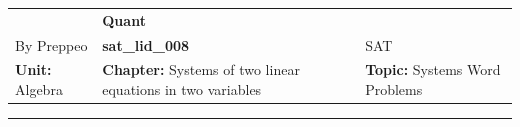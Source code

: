 \documentclass[11pt,paper=a4,answers]{exam}
\begin{document}
\begin{center}
    \centering
    \renewcommand{\arraystretch}{1.5}
    \begin{tabularx}{\textwidth}{YYY}
    & \normalsize\bf{{\Large{{Quant}}}} & \\
    By Preppeo & \normalsize\bf{{sat\_lid\_008}} & SAT\\
    \normalsize{{\textbf{{Unit:}} Algebra}} & \normalsize{{\textbf{{Chapter:}} Systems of two linear equations in two variables}} & \normalsize{{\textbf{{Topic:}} Systems Word Problems}} \\
    \end{tabularx}
\end{center}
\par\noindent\rule{\textwidth}{1pt}
\end{document}
